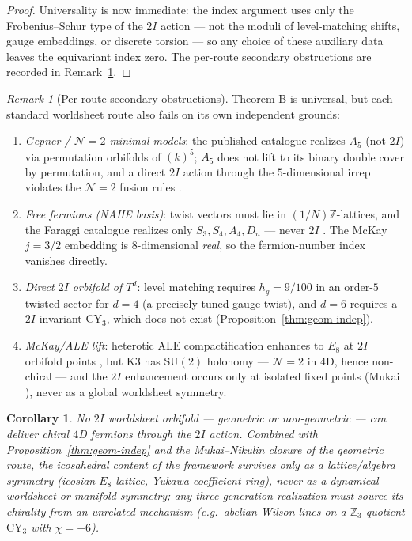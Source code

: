 \documentclass[11pt,a4paper]{amsart}
\newtheorem*{maincorollary}{Corollary}
\theoremstyle{definition}
\theoremstyle{remark}
\newtheorem{remark}[theorem]{Remark}
\newcommand{\SU}{\mathrm{SU}}
\newcommand{\bbZ}{\mathbb{Z}}
\begin{document}
\begin{proof}
Universality is now immediate: the index argument uses only the
Frobenius--Schur type of the $2I$ action --- not the moduli of
level-matching shifts, gauge embeddings, or discrete torsion --- so any
choice of these auxiliary data leaves the equivariant index zero. The
per-route secondary obstructions are recorded in Remark~\ref{rem:routes}.
\end{proof}

\begin{remark}[Per-route secondary obstructions]\label{rem:routes}
Theorem B is universal, but each standard worldsheet route also fails on
its own independent grounds:
\begin{enumerate}
  \item \emph{Gepner / $\mathcal{N}=2$ minimal models}: the published
        catalogue realizes $A_5$ (not $2I$) via permutation orbifolds of
        $(k)^5$; $A_5$ does not lift to its binary double cover by
        permutation, and a direct $2I$ action through the $5$-dimensional
        irrep violates the $\mathcal{N}=2$ fusion rules
        \cite{Gepner1988, KlemmSchimmrigk1994}.
  \item \emph{Free fermions (NAHE basis)}: twist vectors must lie in
        $(1/N)\bbZ$-lattices, and the Faraggi catalogue realizes only
        $S_3, S_4, A_4, D_n$ --- never $2I$ \cite{Faraggi2018}. The McKay
        $j = 3/2$ embedding is $8$-dimensional \emph{real}, so the
        fermion-number index vanishes directly.
  \item \emph{Direct $2I$ orbifold of $T^d$}: level matching requires
        $h_g = 9/100$ in an order-$5$ twisted sector for $d = 4$ (a
        precisely tuned gauge twist), and $d = 6$ requires a
        $2I$-invariant $\mathrm{CY}_3$, which does not exist
        (Proposition~\ref{thm:geom-indep}).
  \item \emph{McKay/ALE lift}: heterotic ALE compactification enhances to
        $E_8$ at $2I$ orbifold points \cite{Polchinski1998}, but K3 has
        $\SU(2)$ holonomy --- $\mathcal{N} = 2$ in 4D, hence non-chiral ---
        and the $2I$ enhancement occurs only at isolated fixed points
        (Mukai \cite{Mukai1988}), never as a global worldsheet symmetry.
\end{enumerate}
\end{remark}

\begin{maincorollary}
No $2I$ worldsheet orbifold --- geometric or non-geometric --- can deliver
chiral $4$D fermions through the $2I$ action. Combined with
Proposition~\ref{thm:geom-indep} and the Mukai--Nikulin closure
\cite{Mukai1988, Nikulin1979} of the geometric route, the icosahedral
content of the framework survives only as a lattice/algebra symmetry
(icosian $E_8$ lattice, Yukawa coefficient ring), never as a dynamical
worldsheet or manifold symmetry; any three-generation realization must
source its chirality from an unrelated mechanism (e.g.\ abelian Wilson
lines on a $\bbZ_3$-quotient $\mathrm{CY}_3$ with $\chi = -6$).
\end{maincorollary}
\end{document}
